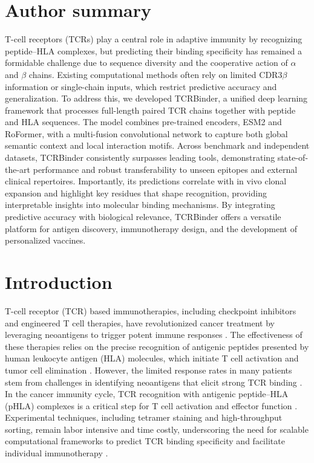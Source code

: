 \documentclass[10pt,letterpaper]{article}
\begin{document}
\section*{Author summary}
T-cell receptors (TCRs) play a central role in adaptive immunity by recognizing peptide–HLA complexes, but predicting their binding specificity has remained a formidable challenge due to sequence diversity and the cooperative action of $\alpha$ and $\beta$ chains. Existing computational methods often rely on limited CDR3$\beta$ information or single-chain inputs, which restrict predictive accuracy and generalization. To address this, we developed TCRBinder, a unified deep learning framework that processes full-length paired TCR chains together with peptide and HLA sequences. The model combines pre-trained encoders, ESM2 and RoFormer, with a multi-fusion convolutional network to capture both global semantic context and local interaction motifs. Across benchmark and independent datasets, TCRBinder consistently surpasses leading tools, demonstrating state-of-the-art performance and robust transferability to unseen epitopes and external clinical repertoires. Importantly, its predictions correlate with in vivo clonal expansion and highlight key residues that shape recognition, providing interpretable insights into molecular binding mechanisms. By integrating predictive accuracy with biological relevance, TCRBinder offers a versatile platform for antigen discovery, immunotherapy design, and the development of personalized vaccines.

\linenumbers

\section*{Introduction}
T-cell receptor (TCR) based immunotherapies, including checkpoint inhibitors and engineered T cell therapies, have revolutionized cancer treatment by leveraging neoantigens to trigger potent immune responses \cite{ref1,ref2,ref3}. The effectiveness of these therapies relies on the precise recognition of antigenic peptides presented by human leukocyte antigen (HLA) molecules, which initiate T cell activation and tumor cell elimination \cite{ref4,ref5,ref6}. However, the limited response rates in many patients stem from challenges in identifying neoantigens that elicit strong TCR binding \cite{ref7,ref8,ref9}. In the cancer immunity cycle, TCR recognition with antigenic peptide–HLA (pHLA) complexes is a critical step for T cell activation and effector function \cite{ref10,ref11}. Experimental techniques, including tetramer staining and high-throughput sorting, remain labor intensive and time costly, underscoring the need for scalable computational frameworks to predict TCR binding specificity and facilitate individual immunotherapy \cite{ref12,ref13,ref14}.
\end{document}
